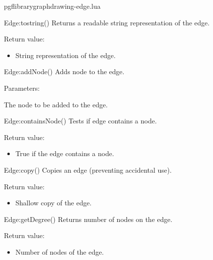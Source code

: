 
\begin{filedescription}{pgflibrarygraphdrawing-edge.lua}


\begin{luacommand}{{Edge:\textunderscore{}\textunderscore{}tostring}()}
Returns a readable string representation of the edge.


Return value:
\begin{itemize} \item[] String representation of the edge. \end{itemize}


\end{luacommand}\begin{luacommand}{{Edge:addNode}()}
Adds node to the edge.

Parameters:
\begin{parameterdescription}
	\item[\meta{node}] The node to be added to the edge.
\end{parameterdescription}



\end{luacommand}\begin{luacommand}{{Edge:containsNode}()}
Tests if edge contains a node.


Return value:
\begin{itemize} \item[] True if the edge contains a node. \end{itemize}


\end{luacommand}\begin{luacommand}{{Edge:copy}()}
Copies an edge (preventing accidental use).


Return value:
\begin{itemize} \item[] Shallow copy of the edge. \end{itemize}


\end{luacommand}\begin{luacommand}{{Edge:getDegree}()}
Returns number of nodes on the edge.


Return value:
\begin{itemize} \item[] Number of nodes of the edge. \end{itemize}



\end{luacommand}
\end{filedescription}
